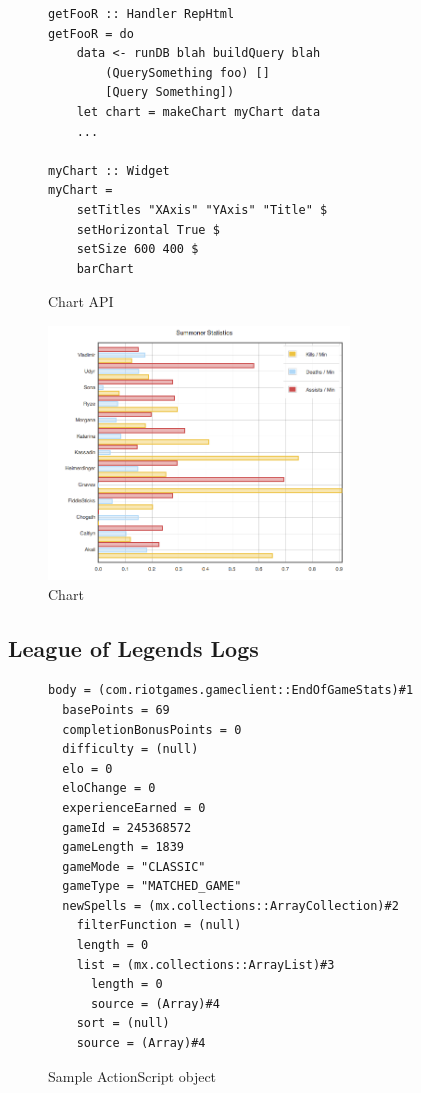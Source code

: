 \documentclass[letterpaper,twocolumn,9pt]{article}
\begin{document}
\begin{figure}[]
\footnotesize{
\begin{verbatim}
getFooR :: Handler RepHtml
getFooR = do
    data <- runDB blah buildQuery blah
        (QuerySomething foo) []
        [Query Something])
    let chart = makeChart myChart data
    ...

myChart :: Widget
myChart =
    setTitles "XAxis" "YAxis" "Title" $
    setHorizontal True $
    setSize 600 400 $
    barChart
\end{verbatim}
}
    \caption{Chart API}
    \label{chartcode}
\end{figure}

\begin{figure}[h]
    \includegraphics[width=80mm]{imgs/chart.png}
    \caption{Chart}
    \label{chart}
\end{figure}

\subsection{League of Legends Logs}

\begin{figure}[btp]
\footnotesize{
\begin{verbatim}
body = (com.riotgames.gameclient::EndOfGameStats)#1
  basePoints = 69
  completionBonusPoints = 0
  difficulty = (null)
  elo = 0
  eloChange = 0
  experienceEarned = 0
  gameId = 245368572
  gameLength = 1839
  gameMode = "CLASSIC"
  gameType = "MATCHED_GAME"
  newSpells = (mx.collections::ArrayCollection)#2
    filterFunction = (null)
    length = 0
    list = (mx.collections::ArrayList)#3
      length = 0
      source = (Array)#4
    sort = (null)
    source = (Array)#4
\end{verbatim}
}
    \caption{Sample ActionScript object}
    \label{samplelog}
\end{figure}
\end{document}
